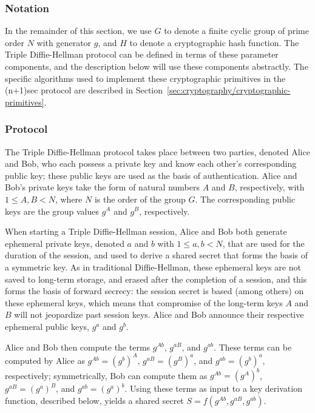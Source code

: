 \documentclass{article}
\begin{document}
\subsubsection{Notation}
\label{sec:cryptography/triple-diffie-hellman/notation}

In the remainder of this section, we use $G$ to denote a finite cyclic group of prime order $N$ with generator $g$, and $H$ to denote a cryptographic hash function.
The Triple Diffie-Hellman protocol can be defined in terms of these parameter components, and the description below will use these components abstractly.
The specific algorithms used to implement these cryptographic primitives in the (n+1)sec protocol are described in Section~\ref{sec:cryptography/cryptographic-primitives}.

\subsubsection{Protocol}
\label{sec:cryptography/triple-diffie-hellman/protocol}

The Triple Diffie-Hellman protocol takes place between two parties, denoted Alice and Bob, who each possess a private key and know each other's corresponding public key; these public keys are used as the basis of authentication.
Alice and Bob's private keys take the form of natural numbers $A$ and $B$, respectively, with $1 \leq A, B < N$, where $N$ is the order of the group $G$.
The corresponding public keys are the group values $g^A$ and $g^B$, respectively.

When starting a Triple Diffie-Hellman session, Alice and Bob both generate ephemeral private keys, denoted $a$ and $b$ with $1 \leq a, b < N$, that are used for the duration of the session, and used to derive a shared secret that forms the basis of a symmetric key.
As in traditional Diffie-Hellman, these ephemeral keys are not saved to long-term storage, and erased after the completion of a session, and this forms the basis of forward secrecy: the session secret is based (among others) on these ephemeral keys, which means that compromise of the long-term keys $A$ and $B$ will not jeopardize past session keys.
Alice and Bob announce their respective ephemeral public keys, $g^a$ and $g^b$.

Alice and Bob then compute the terms $g^{Ab}$, $g^{aB}$, and $g^{ab}$.
These terms can be computed by Alice as $g^{Ab} = (g^b)^A$, $g^{aB} = (g^B)^a$, and $g^{ab} = (g^b)^a$, respectively; symmetrically, Bob can compute them as $g^{Ab} = (g^A)^b$, $g^{aB} = (g^a)^B$, and $g^{ab} = (g^a)^b$.
Using these terms as input to a key derivation function, described below, yields a shared secret $S = f(g^{Ab}, g^{aB}, g^{ab})$.
\end{document}
